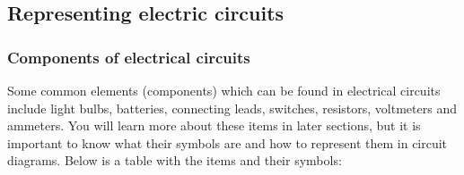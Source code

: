 

\subsection{Representing electric circuits}

\subsubsection{Components of electrical circuits}
Some common elements (components) which can be found in electrical circuits include light bulbs, batteries, connecting leads, switches, resistors, voltmeters and ammeters. You will learn more about these items in later sections, but it is important to know what their symbols are and how to represent them in circuit diagrams. Below is a table with the items and their symbols:

